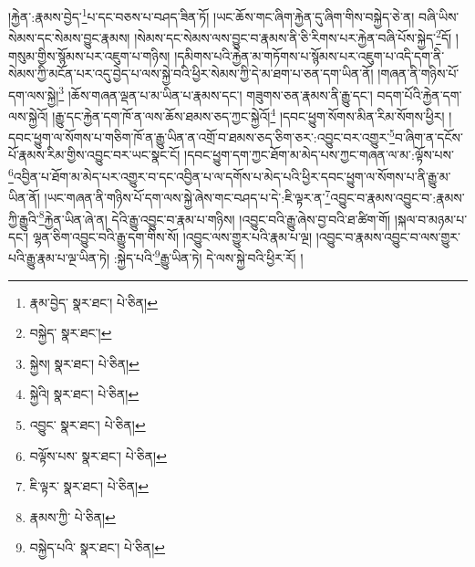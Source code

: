 །རྐྱེན་:རྣམས་བྱེད་\footnote{རྣམ་བྱེད་  སྣར་ཐང་།  པེ་ཅིན། }པ་དང་བཅས་པ་བཤད་ཟིན་ཏོ། །ཡང་ཆོས་གང་ཞིག་རྐྱེན་དུ་ཞིག་གིས་བསྐྱེད་ཅེ་ན། བཞི་ཡིས་སེམས་དང་སེམས་བྱུང་རྣམས། །སེམས་དང་སེམས་ལས་བྱུང་བ་རྣམས་ནི་ཅི་རིགས་པར་རྐྱེན་བཞི་པོས་སྐྱེད་\footnote{བསྐྱེད་  སྣར་ཐང་། }དོ། །གསུམ་གྱིས་སྙོམས་པར་འཇུག་པ་གཉིས། །དམིགས་པའི་རྐྱེན་མ་གཏོགས་པ་སྙོམས་པར་འཇུག་པ་འདི་དག་ནི་སེམས་ཀྱི་མངོན་པར་འདུ་བྱེད་པ་ལས་སྐྱེ་བའི་ཕྱིར་སེམས་ཀྱི་དེ་མ་ཐག་པ་ཅན་དག་ཡིན་ནོ། །གཞན་ནི་གཉིས་པོ་དག་ལས་སྐྱེ།\footnote{སྐྱེས།  སྣར་ཐང་།  པེ་ཅིན། } །ཆོས་གཞན་ལྡན་པ་མ་ཡིན་པ་རྣམས་དང་། གཟུགས་ཅན་རྣམས་ནི་རྒྱུ་དང་། བདག་པོའི་རྐྱེན་དག་ལས་སྐྱེའོ། །རྒྱུ་དང་རྐྱེན་དག་ཁོ་ན་ལས་ཆོས་ཐམས་ཅད་ཀྱང་སྐྱེའོ།\footnote{སྐྱེའི།  སྣར་ཐང་།  པེ་ཅིན། } །དབང་ཕྱུག་སོགས་མིན་རིམ་སོགས་ཕྱིར། །དབང་ཕྱུག་ལ་སོགས་པ་གཅིག་ཁོ་ན་རྒྱུ་ཡིན་ན་འགྲོ་བ་ཐམས་ཅད་ཅིག་ཅར་:འབྱུང་བར་འགྱུར་\footnote{འབྱུང་  སྣར་ཐང་།  པེ་ཅིན། }བ་ཞིག་ན་དངོས་པོ་རྣམས་རིམ་གྱིས་འབྱུང་བར་ཡང་སྣང་ངོ། །དབང་ཕྱུག་དག་ཀྱང་ཐོག་མ་མེད་པས་ཀྱང་གཞན་ལ་མ་:ལྟོས་པས་\footnote{བལྟོས་པས་  སྣར་ཐང་།  པེ་ཅིན། }འབྱིན་པ་ཐོག་མ་མེད་པར་འགྱུར་བ་དང་འབྱིན་པ་ལ་དགོས་པ་མེད་པའི་ཕྱིར་དབང་ཕྱུག་ལ་སོགས་པ་ནི་རྒྱུ་མ་ཡིན་ནོ། །ཡང་གཞན་ནི་གཉིས་པོ་དག་ལས་སྐྱེ་ཞེས་གང་བཤད་པ་དེ་:ཇི་ལྟར་ན་\footnote{ཇི་ལྟར་  སྣར་ཐང་།  པེ་ཅིན། }འབྱུང་བ་རྣམས་འབྱུང་བ་:རྣམས་ཀྱི་རྒྱུའི་\footnote{རྣམས་ཀྱི་  པེ་ཅིན། }རྐྱེན་ཡིན་ཞེ་ན། དེའི་རྒྱུ་འབྱུང་བ་རྣམ་པ་གཉིས། །འབྱུང་བའི་རྒྱུ་ཞེས་བྱ་བའི་ཐ་ཚིག་གོ། །སྐལ་བ་མཉམ་པ་དང་། ལྷན་ཅིག་འབྱུང་བའི་རྒྱུ་དག་གིས་སོ། །འབྱུང་ལས་གྱུར་པའི་རྣམ་པ་ལྔ། །འབྱུང་བ་རྣམས་འབྱུང་བ་ལས་གྱུར་པའི་རྒྱུ་རྣམ་པ་ལྔ་ཡིན་ཏེ། :སྐྱེད་པའི་\footnote{བསྐྱེད་པའི་  སྣར་ཐང་།  པེ་ཅིན། }རྒྱུ་ཡིན་ཏེ། དེ་ལས་སྐྱེ་བའི་ཕྱིར་རོ། །
